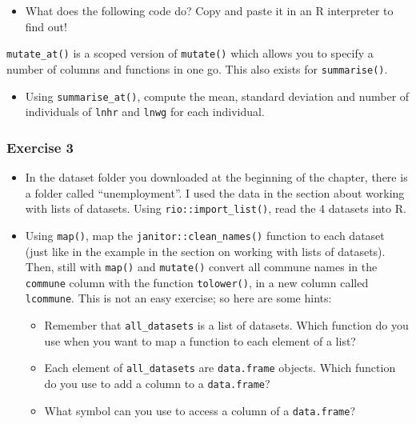 \documentclass[]{gitbook}
\newenvironment{Shaded}{\begin{snugshade}}{\end{snugshade}}
\newcommand{\KeywordTok}[1]{\textcolor[rgb]{0.13,0.29,0.53}{\textbf{#1}}}
\newcommand{\NormalTok}[1]{#1}
\newcommand{\OperatorTok}[1]{\textcolor[rgb]{0.81,0.36,0.00}{\textbf{#1}}}
\newcommand{\StringTok}[1]{\textcolor[rgb]{0.31,0.60,0.02}{#1}}
\providecommand{\tightlist}{%
  \setlength{\itemsep}{0pt}\setlength{\parskip}{0pt}}
\theoremstyle{definition}
\theoremstyle{definition}
\theoremstyle{definition}
\theoremstyle{remark}
\begin{document}
\begin{itemize}
\tightlist
\item
  What does the following code do? Copy and paste it in an R interpreter
  to find out!
\end{itemize}

\begin{Shaded}
\end{Shaded}

\texttt{mutate\_at()} is a scoped version of \texttt{mutate()} which
allows you to specify a number of columns and functions in one go. This
also exists for \texttt{summarise()}.

\begin{itemize}
\tightlist
\item
  Using \texttt{summarise\_at()}, compute the mean, standard deviation
  and number of individuals of \texttt{lnhr} and \texttt{lnwg} for each
  individual.
\end{itemize}

\hypertarget{exercise-3-1}{%
\subsubsection*{Exercise 3}\label{exercise-3-1}}

\begin{itemize}
\item
  In the dataset folder you downloaded at the beginning of the chapter,
  there is a folder called ``unemployment''. I used the data in the
  section about working with lists of datasets. Using
  \texttt{rio::import\_list()}, read the 4 datasets into R.
\item
  Using \texttt{map()}, map the \texttt{janitor::clean\_names()}
  function to each dataset (just like in the example in the section on
  working with lists of datasets). Then, still with \texttt{map()} and
  \texttt{mutate()} convert all commune names in the \texttt{commune}
  column with the function \texttt{tolower()}, in a new column called
  \texttt{lcommune}. This is not an easy exercise; so here are some
  hints:

  \begin{itemize}
  \tightlist
  \item
    Remember that \texttt{all\_datasets} is a list of datasets. Which
    function do you use when you want to map a function to each element
    of a list?
  \item
    Each element of \texttt{all\_datasets} are \texttt{data.frame}
    objects. Which function do you use to add a column to a
    \texttt{data.frame}?
  \item
    What symbol can you use to access a column of a \texttt{data.frame}?
  \end{itemize}
\end{itemize}
\end{document}
